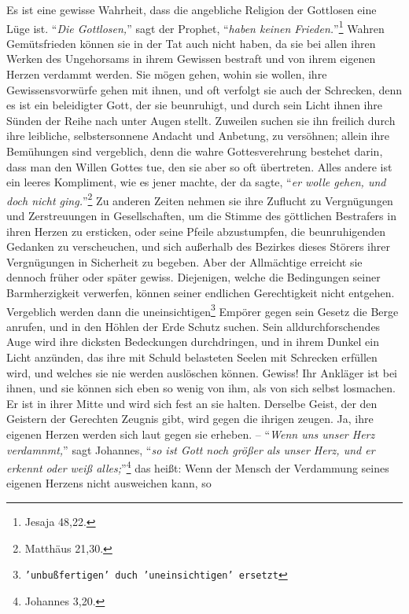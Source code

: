Es ist eine gewisse Wahrheit, dass die angebliche Religion der Gottlosen eine Lüge
ist.
"`\textit{Die Gottlosen,}"' sagt der Prophet, "`\textit{haben keinen Frieden.}"'\footnote{Jesaja 48,22.} 
Wahren Gemütsfrieden können sie in der Tat auch nicht haben, da sie bei allen
ihren Werken des Ungehorsams in ihrem Gewissen bestraft und von ihrem eigenen
Herzen verdammt werden.
Sie mögen gehen, wohin sie wollen, ihre Gewissensvorwürfe gehen mit ihnen, und
oft verfolgt sie auch der Schrecken,
denn es ist ein beleidigter Gott, der sie beunruhigt, und durch sein Licht ihnen
ihre Sünden der Reihe nach unter Augen stellt.
Zuweilen suchen sie ihn freilich durch ihre leibliche, selbstersonnene Andacht
und Anbetung, zu versöhnen;
allein ihre Bemühungen sind vergeblich,
denn die wahre Gottesverehrung bestehet darin, dass man den Willen Gottes tue,
den sie aber so oft übertreten.
Alles andere ist ein leeres Kompliment, wie es jener machte, der da sagte,
"`\textit{er wolle gehen, und doch nicht ging.}"'\footnote{Matthäus 21,30.}
Zu anderen Zeiten nehmen sie ihre Zuflucht zu Vergnügungen und Zerstreuungen in
Gesellschaften, um die Stimme des göttlichen Bestrafers in ihren Herzen zu
ersticken, oder seine Pfeile abzustumpfen, die beunruhigenden Gedanken zu
verscheuchen, und sich außerhalb des Bezirkes dieses Störers ihrer Vergnügungen
in Sicherheit zu begeben.
Aber der Allmächtige erreicht sie dennoch früher oder später gewiss.
Diejenigen, welche die Bedingungen seiner Barmherzigkeit verwerfen, können
seiner endlichen Gerechtigkeit nicht entgehen.
Vergeblich werden dann die uneinsichtigen\footnote{\texttt{'unbußfertigen' duch
'uneinsichtigen' ersetzt}} Empörer gegen sein Gesetz die Berge anrufen, und in
den Höhlen der Erde Schutz suchen.
Sein alldurchforschendes Auge wird ihre dicksten Bedeckungen durchdringen, und
in ihrem Dunkel ein Licht anzünden, das ihre mit Schuld belasteten Seelen mit
Schrecken erfüllen wird, und welches sie nie werden auslöschen können.
Gewiss!
Ihr Ankläger ist bei ihnen, und sie können sich eben so wenig von ihm, als von
sich selbst losmachen.
Er ist in ihrer Mitte und wird sich fest an sie halten.
Derselbe Geist, der den Geistern der Gerechten Zeugnis gibt, wird gegen die
ihrigen zeugen.
Ja, ihre eigenen Herzen werden sich laut gegen sie erheben.
-- "`\textit{Wenn uns unser Herz verdamnmt,}"' sagt Johannes, "`\textit{so ist
Gott noch größer als unser Herz, und er erkennt oder weiß alles;}"'\footnote{Johannes 3,20.}  das heißt:
Wenn der Mensch der Verdammung seines eigenen Herzens nicht ausweichen kann, so
